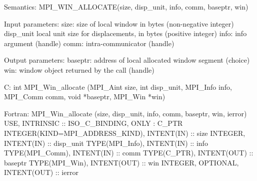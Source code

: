 Semantics:
MPI_WIN_ALLOCATE(size, disp_unit, info, comm, baseptr, win)

Input parameters:
size: size of local window in bytes (non-negative integer)
disp_unit local unit size for displacements, in bytes (positive
integer)
info: info argument (handle)
comm: intra-communicator (handle)

Output parameters:
baseptr: address of local allocated window segment (choice)
win: window object returned by the call (handle)

C:
int MPI_Win_allocate
   (MPI_Aint size, int disp_unit, MPI_Info info,
    MPI_Comm comm, void *baseptr, MPI_Win *win)

Fortran:
MPI_Win_allocate
   (size, disp_unit, info, comm, baseptr, win, ierror)
USE, INTRINSIC :: ISO_C_BINDING, ONLY : C_PTR
INTEGER(KIND=MPI_ADDRESS_KIND), INTENT(IN) :: size
INTEGER, INTENT(IN) :: disp_unit
TYPE(MPI_Info), INTENT(IN) :: info
TYPE(MPI_Comm), INTENT(IN) :: comm
TYPE(C_PTR), INTENT(OUT) :: baseptr
TYPE(MPI_Win), INTENT(OUT) :: win
INTEGER, OPTIONAL, INTENT(OUT) :: ierror
